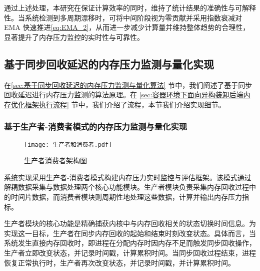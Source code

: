 
通过上述处理，本研究在保证计算效率的同时，维持了统计结果的准确性与可解释性。当系统检测到多周期漂移时，可将中间阶段视为零贡献并采用指数衰减对 EMA 快速推进\ref{eq:EMA_2}，从而进一步减少计算量并维持整体趋势的合理性，显著提升了内存压力监控的实时性与可靠性。



\subsection{基于同步回收延迟的内存压力监测与量化实现}

在\ref{sec:基于同步回收延迟的内存压力监测与量化算法} 节中，我们阐述了基于同步回收延迟进行内存压力监测的算法原理。在 \ref{sec:容器环境下面向异构装卸后端内存优化框架执行流程} 节中，我们介绍了流程，本节我们介绍实现细节。

\subsubsection{基于生产者-消费者模式的内存压力监测与量化实现}

\begin{figure}[H]
    \centering
    \texttt{[image: 生产者和消费者.pdf]}
    \caption{生产者消费者架构图}
    \label{fig:producer-consumer}
\end{figure}



系统实现采用生产者-消费者模式构建内存压力实时监控与评估框架。该模式通过解耦数据采集与数据处理两个核心功能模块。生产者模块负责采集内存回收过程中的时间片数据，而消费者模块则周期性地处理这些数据，计算并输出内存压力指标。

生产者模块的核心功能是精确捕获内核中与内存回收相关的状态切换时间信息。为实现这一目标，生产者在同步内存回收的起始和结束时刻改变状态。具体而言，当系统发生直接内存回收时，即进程在分配内存时因内存不足而触发同步回收操作，生产者立即改变状态，并记录时间戳，计算累积时间。当同步回收过程结束，进程恢复正常执行时，生产者再次改变状态，并记录时间戳，并计算累积时间。

